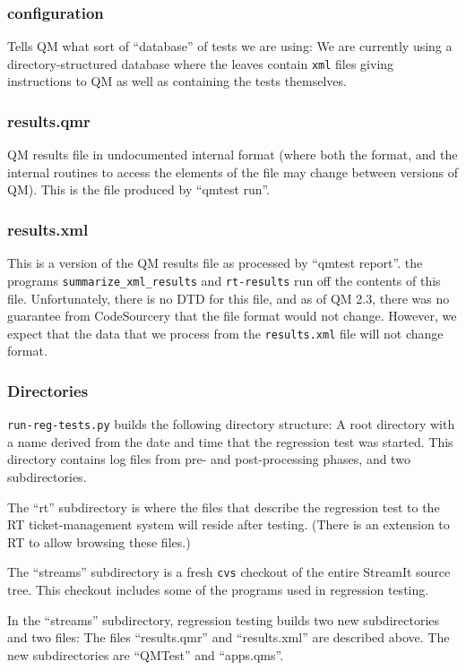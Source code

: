 \documentclass[11pt]{article}
\begin{document}
\subsubsection{configuration}
Tells QM what sort of ``database'' of tests we are using:  We are currently
using a directory-structured database where the leaves contain {\tt  xml} 
files giving instructions to QM as well as containing the tests themselves.

\subsubsection{results.qmr}
QM results file in undocumented internal format (where both the
format, and the internal routines to access the elements of the file
may change between versions of QM).  This is the file produced by
``qmtest run''.

\subsubsection{results.xml}
This is a version of the QM results file as processed by ``qmtest report''.
the programs {\tt summarize_xml_results} and {\tt rt-results} run off
the contents of this file.
Unfortunately, there is no DTD for this file, and as of QM 2.3, there
was no guarantee from CodeSourcery that the file format would not
change.
However, we expect that the data that we process from the {\tt results.xml}
file will not change format.

\subsubsection{Directories}
{\tt run-reg-tests.py} builds the following directory structure:
A root directory with a name derived from the date and time that the
regression test was started.
This directory contains log files from pre- and post-processing
phases, and two subdirectories.

The ``rt'' subdirectory is where the files that describe the
regression test to the RT ticket-management system will reside after
testing. (There is an extension to RT to allow browsing these files.)

The ``streams'' subdirectory is a fresh {\tt cvs} checkout of the
entire StreamIt source tree.  This checkout includes some of the
programs used in regression testing.

In the ``streams'' subdirectory, regression testing builds two new
subdirectories and two files:  The files ``results.qmr'' and
``results.xml'' are described above.
The new subdirectories are ``QMTest'' and ``apps.qms''.
\end{document}

